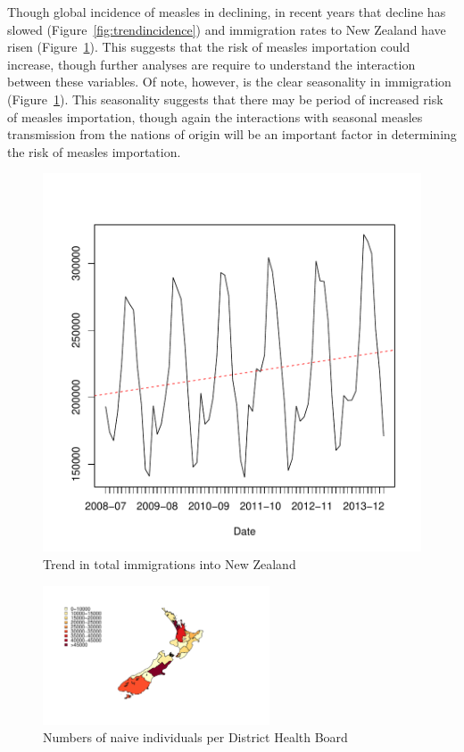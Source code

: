 \documentclass{article}
\begin{document}
Though global incidence of measles in declining, in recent years that decline has slowed (Figure~\ref{fig:trendincidence}) and immigration rates to New Zealand have risen (Figure~\ref{fig:trendimmigration}). This suggests that the risk of measles importation could increase, though further analyses are require to understand the interaction between these variables.  Of note, however, is the clear seasonality in immigration (Figure~\ref{fig:trendimmigration}).  This seasonality suggests that there may be period of increased risk of measles importation, though again the interactions with seasonal measles transmission from the nations of origin will be an important factor in determining the risk of measles importation.

\begin{figure}[h!]
\begin{center}
\includegraphics{draftfinalreport-031}
\end{center}
\caption{Trend in total immigrations into New Zealand}
\label{fig:trendimmigration}
\end{figure}

\begin{figure}
     \begin{center}
     \includegraphics[width=0.6\textwidth]{naive_map.pdf}
     \end{center}
     \caption{Numbers of naive individuals per District Health Board}
     \label{fig:naive_map}
\end{figure}
\end{document}
